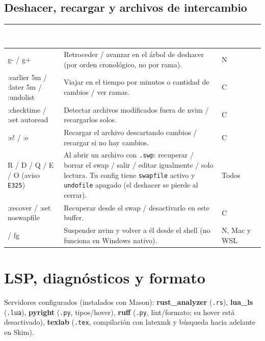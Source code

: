 \documentclass[8pt,a4paper,landscape]{extarticle}
\newcommand{\kk}[1]{\texttt{#1}}
\newenvironment{cht}{%
  \begin{longtable}{>{\raggedright\arraybackslash\ttfamily}p{0.27\textwidth}
                    >{\raggedright\arraybackslash}p{0.46\textwidth}
                    >{\raggedright\arraybackslash}p{0.21\textwidth}}
  \rowcolor{accent}\textcolor{white}{\textbf{\rmfamily Comando / atajo}} &
  \textcolor{white}{\textbf{Qué hace}} & \textcolor{white}{\textbf{Dónde funciona}} \\
  \endhead
}{\end{longtable}}
\newcommand{\rr}[3]{#1 & #2 & #3 \\}
\newcommand{\rg}[3]{\rowcolor{rowgray}\relax #1 & #2 & #3 \\}
\let\oldsubsection\subsection
\renewcommand{\subsection}{\Needspace{9\baselineskip}\oldsubsection}
\let\oldsection\section
\renewcommand{\section}{\Needspace{10\baselineskip}\oldsection}
\begin{document}
\subsection{Deshacer, recargar y archivos de intercambio}
\begin{cht}
\rg{g- / g+}{Retroceder / avanzar en el árbol de deshacer (por orden cronológico, no por rama).}{N}
\rr{:earlier 5m / :later 5m / :undolist}{Viajar en el tiempo por minutos o cantidad de cambios / ver ramas.}{C}
\rg{:checktime / :set autoread}{Detectar archivos modificados fuera de nvim / recargarlos solos.}{C}
\rr{:e! / :e}{Recargar el archivo descartando cambios / recargar si no hay cambios.}{C}
\rg{R / D / Q / E / O (aviso \kk{E325})}{Al abrir un archivo con \kk{.swp}: recuperar / borrar el swap / salir / editar igualmente / solo lectura. Tu config tiene \kk{swapfile} activo y \kk{undofile} apagado (el deshacer se pierde al cerrar).}{Todos}
\rr{:recover / :set noswapfile}{Recuperar desde el swap / desactivarlo en este buffer.}{C}
\rg{<C-z> / fg}{Suspender nvim y volver a él desde el shell (no funciona en Windows nativo).}{N, Mac y WSL}
\end{cht}

\section{LSP, diagnósticos y formato}

Servidores configurados (instalados con Mason): \textbf{rust\_analyzer} (\kk{.rs}), \textbf{lua\_ls} (\kk{.lua}), \textbf{pyright} (\kk{.py}, tipos/hover), \textbf{ruff} (\kk{.py}, lint/formato; su hover está desactivado), \textbf{texlab} (\kk{.tex}, compilación con latexmk y búsqueda hacia adelante en Skim).
\end{document}
